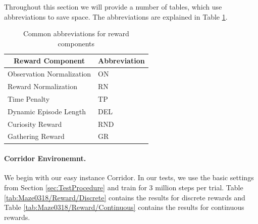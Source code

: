 Throughout this section we will provide a number of tables, which use abbreviations to save space. The abbreviations are explained in Table \ref{tab:RewardAbbreviations}.  

\begin{table} [ht]
    \begin{center}
        \begin{tabular}{ll}
            \toprule
            \multicolumn{1}{c}{Reward Component} & Abbreviation \\
            \midrule
            Observation Normalization & ON \\
            Reward Normalization & RN \\
            Time Penalty & TP \\
            Dynamic Episode Length & DEL \\
            Curiosity Reward & RND \\
            Gathering Reward & GR \\
            \bottomrule
            
        \end{tabular}
    \end{center}
    \caption[Abbreviations for Reward Components]{Common abbreviations for reward components} \label{tab:RewardAbbreviations}
\end{table}



\paragraph{Corridor Environemnt.}
We begin with our easy instance Corridor. In our tests, we use the basic settings from Section \ref{sec:TestProcedure} and train for 3 million steps per trial. Table \ref{tab:Maze0318/Reward/Discrete} contains the results for discrete rewards and Table \ref{tab:Maze0318/Reward/Continuous} contains the results for continuous rewards.


